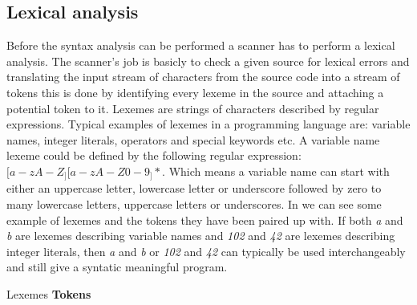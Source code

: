 \subsection{Lexical analysis}
\label{sec:lexicalanalysis}
Before the syntax analysis can be performed a scanner has to perform a lexical analysis. The scanner's job is basicly to check a given source for lexical errors and translating the input stream of characters from the source code into a stream of tokens \cite[p. 57]{fischer2009} this is done by identifying every lexeme in the source and attaching a potential token to it. Lexemes are strings of characters described by regular expressions. Typical examples of lexemes in a programming language are: variable names, integer literals, operators and special keywords etc. A variable name lexeme could be defined by the following regular expression: $[a-zA-Z_][a-zA-Z0-9_]*$. Which means a variable name can start with either an uppercase letter, lowercase letter or underscore followed by zero to many lowercase letters, uppercase letters or underscores. In  we can see some example of lexemes and the tokens they have been paired up with. If both \textit{a} and \textit{b} are lexemes describing variable names and \textit{102} and \textit{42} are lexemes describing integer literals, then \textit{a} and \textit{b} or \textit{102} and \textit{42} can typically be used interchangeably and still give a syntatic meaningful program.

		    {               }
{Lexemes   }{\textbf{Tokens}}{
}